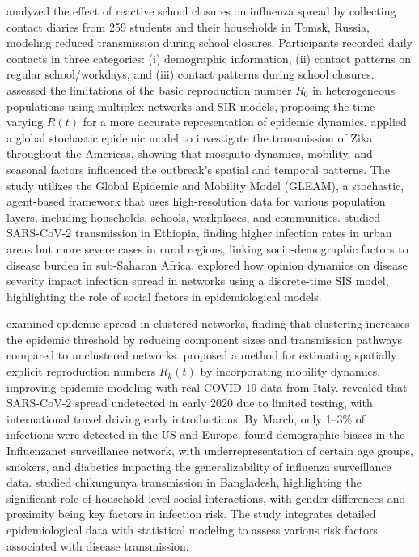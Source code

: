 \documentclass[9 pt]{article} %
\begin{document}
\cite{doi:10.1073/pnas.1821298116} analyzed the effect of reactive school closures on influenza spread by collecting contact diaries from 259 students and their households in Tomsk, Russia, modeling reduced transmission during school closures. Participants recorded daily contacts in three categories: (i) demographic information, (ii) contact patterns on regular school/workdays, and (iii) contact patterns during school closures. \cite{doi:10.1073/pnas.1811115115} assessed the limitations of the basic reproduction number \( R_0 \) in heterogeneous populations using multiplex networks and SIR models, proposing the time-varying \( R(t) \) for a more accurate representation of epidemic dynamics. \cite{doi:10.1073/pnas.1620161114} applied a global stochastic epidemic model to investigate the transmission of Zika throughout the Americas, showing that mosquito dynamics, mobility, and seasonal factors influenced the outbreak's spatial and temporal patterns. The study utilizes the Global Epidemic and Mobility Model (GLEAM), a stochastic, agent-based framework that uses high-resolution data for various population layers, including households, schools, workplaces, and communities. \cite{trentini2021modeling} studied SARS-CoV-2 transmission in Ethiopia, finding higher infection rates in urban areas but more severe cases in rural regions, linking socio-demographic factors to disease burden in sub-Saharan Africa. \cite{xuan2021discrete} explored how opinion dynamics on disease severity impact infection spread in networks using a discrete-time SIS model, highlighting the role of social factors in epidemiological models.

\cite{miller2009percolation} examined epidemic spread in clustered networks, finding that clustering increases the epidemic threshold by reducing component sizes and transmission pathways compared to unclustered networks. \cite{trevisin2023spatially} proposed a method for estimating spatially explicit reproduction numbers \( R_k(t) \) by incorporating mobility dynamics, improving epidemic modeling with real COVID-19 data from Italy.
\cite{davis2021cryptic} revealed that SARS-CoV-2 spread undetected in early 2020 due to limited testing, with international travel driving early introductions. By March, only 1–3\% of infections were detected in the US and Europe. \cite{cantarelli2014representativeness} found demographic biases in the Influenzanet surveillance network, with underrepresentation of certain age groups, smokers, and diabetics impacting the generalizability of influenza surveillance data. \cite{salje2016how} studied chikungunya transmission in Bangladesh, highlighting the significant role of household-level social interactions, with gender differences and proximity being key factors in infection risk. The study integrates detailed epidemiological data with statistical modeling to assess various risk factors associated with disease transmission.
\end{document}
